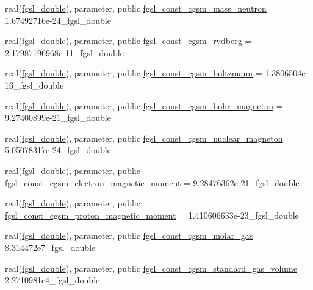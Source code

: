 \begin{DoxyCompactItemize}
\item 
real(\hyperlink{namespacefgsl_a9af5113378e0f000eb479d3f90196ddf}{fgsl\+\_\+double}), parameter, public \hyperlink{namespacefgsl_aa4c1d627604e0ff04d68a92847dc1a00}{fgsl\+\_\+const\+\_\+cgsm\+\_\+mass\+\_\+neutron} = 1.\+67492716e-\/24\+\_\+fgsl\+\_\+double
\item 
real(\hyperlink{namespacefgsl_a9af5113378e0f000eb479d3f90196ddf}{fgsl\+\_\+double}), parameter, public \hyperlink{namespacefgsl_a0f2cb7b75a4fd58c54e5a0b794da13b6}{fgsl\+\_\+const\+\_\+cgsm\+\_\+rydberg} = 2.\+17987196968e-\/11\+\_\+fgsl\+\_\+double
\item 
real(\hyperlink{namespacefgsl_a9af5113378e0f000eb479d3f90196ddf}{fgsl\+\_\+double}), parameter, public \hyperlink{namespacefgsl_abe34761700d2098a3dcde1e962938eb4}{fgsl\+\_\+const\+\_\+cgsm\+\_\+boltzmann} = 1.\+3806504e-\/16\+\_\+fgsl\+\_\+double
\item 
real(\hyperlink{namespacefgsl_a9af5113378e0f000eb479d3f90196ddf}{fgsl\+\_\+double}), parameter, public \hyperlink{namespacefgsl_a106f93e7068726bf01947287eb77faed}{fgsl\+\_\+const\+\_\+cgsm\+\_\+bohr\+\_\+magneton} = 9.\+27400899e-\/21\+\_\+fgsl\+\_\+double
\item 
real(\hyperlink{namespacefgsl_a9af5113378e0f000eb479d3f90196ddf}{fgsl\+\_\+double}), parameter, public \hyperlink{namespacefgsl_a31fef82c84b5351ce89d573f6be1eb8f}{fgsl\+\_\+const\+\_\+cgsm\+\_\+nuclear\+\_\+magneton} = 5.\+05078317e-\/24\+\_\+fgsl\+\_\+double
\item 
real(\hyperlink{namespacefgsl_a9af5113378e0f000eb479d3f90196ddf}{fgsl\+\_\+double}), parameter, public \hyperlink{namespacefgsl_aeef2a928302f3601b87ba01c486de9bd}{fgsl\+\_\+const\+\_\+cgsm\+\_\+electron\+\_\+magnetic\+\_\+moment} = 9.\+28476362e-\/21\+\_\+fgsl\+\_\+double
\item 
real(\hyperlink{namespacefgsl_a9af5113378e0f000eb479d3f90196ddf}{fgsl\+\_\+double}), parameter, public \hyperlink{namespacefgsl_a91a53064c6d7b4c8af4bf3368a896d74}{fgsl\+\_\+const\+\_\+cgsm\+\_\+proton\+\_\+magnetic\+\_\+moment} = 1.\+410606633e-\/23\+\_\+fgsl\+\_\+double
\item 
real(\hyperlink{namespacefgsl_a9af5113378e0f000eb479d3f90196ddf}{fgsl\+\_\+double}), parameter, public \hyperlink{namespacefgsl_a23addc2e9852914913cdbe8e164b27ae}{fgsl\+\_\+const\+\_\+cgsm\+\_\+molar\+\_\+gas} = 8.\+314472e7\+\_\+fgsl\+\_\+double
\item 
real(\hyperlink{namespacefgsl_a9af5113378e0f000eb479d3f90196ddf}{fgsl\+\_\+double}), parameter, public \hyperlink{namespacefgsl_ab7cd57aadb050c6aa836b7ab1246f435}{fgsl\+\_\+const\+\_\+cgsm\+\_\+standard\+\_\+gas\+\_\+volume} = 2.\+2710981e4\+\_\+fgsl\+\_\+double

\end{DoxyCompactItemize}
